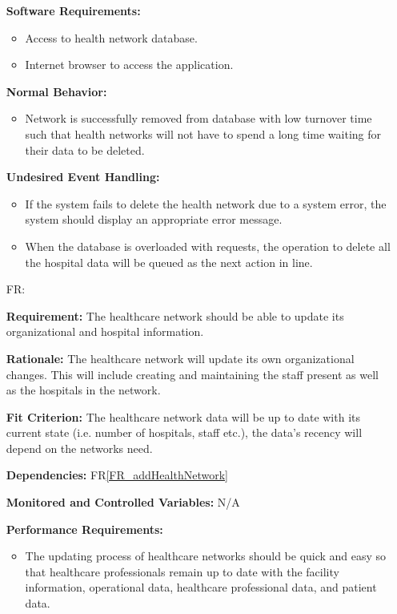 \documentclass[12pt]{article}
\newcounter{reqnum} %
\begin{document}
\begin{itemize}
\textbf{Software Requirements:}
\begin{itemize}
  \item Access to health network database.
  \item Internet browser to access the application.
\end{itemize}

\textbf{Normal Behavior:}
\begin{itemize}
  \item Network is successfully removed from database with low turnover time such that health networks will not have to spend a long time waiting for their data to be deleted.
\end{itemize}

\textbf{Undesired Event Handling:}
\begin{itemize}
  \item If the system fails to delete the health network due to a system error, the system should display an appropriate error message. 
  \item When the database is overloaded with requests, the operation to delete all the hospital data will be queued as the next action in line.
\end{itemize}


\item[FR\refstepcounter{reqnum}\thereqnum \label{FR_UpdateHealthNetwork}:]

\textbf{Requirement:} The healthcare network should be able to update its organizational and hospital information.

\textbf{Rationale:} The healthcare network will update its own organizational changes. This will include creating and maintaining the staff present as well as the hospitals in the network.

\textbf{Fit Criterion:} The healthcare network data will be up to date with its current state (i.e. number of hospitals, staff etc.), the data’s recency will depend on the networks need. 

\textbf{Dependencies:} FR\ref{FR_addHealthNetwork}

\textbf{Monitored and Controlled Variables:} N/A

\textbf{Performance Requirements:} 
\begin{itemize}
  \item The updating process of healthcare networks should be quick and easy so that healthcare professionals remain up to date with the facility information, operational data, healthcare professional data, and patient data.
\end{itemize}


\end{itemize}
\end{document}
